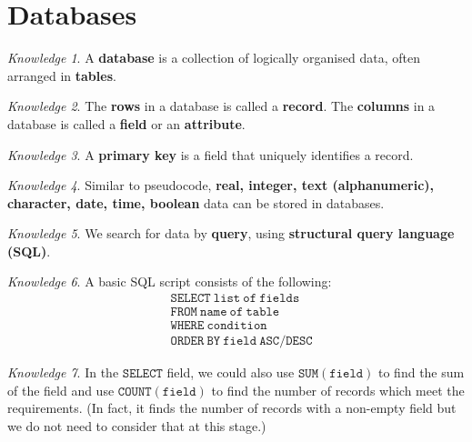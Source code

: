 \documentclass[8pt]{article}
\theoremstyle{remark}
\newtheorem{knowledge}{Knowledge}[subsection]
\begin{document}
    \section{Databases}

        \begin{knowledge}
            A \textbf{database} is a collection of logically organised data, often arranged in \textbf{tables}.
        \end{knowledge}

        \begin{knowledge}
            The \textbf{rows} in a database is called a \textbf{record}. The \textbf{columns} in a database is called a \textbf{field} or an \textbf{attribute}.
        \end{knowledge}

        \begin{knowledge}
            A \textbf{primary key} is a field that uniquely identifies a record.
        \end{knowledge}

        \begin{knowledge}
            Similar to pseudocode, \textbf{real, integer, text (alphanumeric), character, date, time, boolean} data can be stored in databases.
        \end{knowledge}

        \begin{knowledge}
            We search for data by \textbf{query}, using \textbf{structural query language (SQL)}.
        \end{knowledge}

        \begin{knowledge}
            A basic SQL script consists of the following:
            \begin{align*}
                &\mathtt{SELECT\ list\ of\ fields}\\
                &\mathtt{FROM\ name\ of\ table}\\
                &\mathtt{WHERE\ condition}\\
                &\mathtt{ORDER\ BY\ field\ ASC/DESC}
            \end{align*}
        \end{knowledge}

        \begin{knowledge}
            In the \(\mathtt{SELECT}\) field, we could also use \(\mathtt{SUM(field)}\) to find the sum of the field and use \(\mathtt{COUNT(field)}\) to find the number of records which meet the requirements. (In fact, it finds the number of records with a non-empty field but we do not need to consider that at this stage.)
        \end{knowledge}
\end{document}
